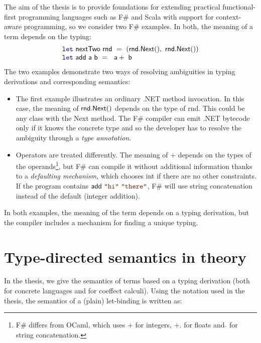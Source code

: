 \documentclass[
		twoside,openright,titlepage,numbers=noenddot,headinclude,%
                footinclude=true,cleardoublepage=empty,
                BCOR=10mm,paper=a4,fontsize=10pt, %
                ngerman,american, %
                ]{scrreprt}
\newcommand{\kvd}[1]{\textnormal{\textcolor{kvdclr}{\ttfamily #1}}}
\newcommand{\str}[1]{\textnormal{\textcolor{strclr}{\ttfamily "#1"}}}
\newcommand{\ident}[1]{\textnormal{\sffamily #1}}
\begin{document}
The aim of the thesis is to provide foundations for extending practical functional-first
programming languages such as F\# \cite{app-fsharp-spec} and Scala \cite{app-scala-spec} with
support for context-aware programming, so we consider two F\# examples. In both, the meaning of
a term depends on the typing:
%
\begin{equation*}
\begin{array}{l}
  \kvd{let}~\ident{nextTwo}~\ident{rnd}~=~(\ident{rnd.Next}(), \ident{rnd.Next}()) \\
  \kvd{let}~\ident{add}~\ident{a}~\ident{b}~=~\ident{a}+\ident{b}
\end{array}
\end{equation*}
%
The two examples demonstrate two ways of resolving ambiguities in typing derivations and
corresponding semantics:

\begin{itemize}
\item The first example illustrates an ordinary .NET method invocation. In this case,
  the meaning of $\ident{rnd.Next}()$ depends on the type of \ident{rnd}. This could be any
  class with the \ident{Next} method. The F\# compiler can emit .NET bytecode only if it knows the
  concrete type and so the developer has to resolve the ambiguity through a \emph{type annotation}.

\item Operators are treated differently. The meaning of $+$ depends on the types of the
  operands\footnote{F\# differs from OCaml, which uses $+$ for integers, $+.$ for floats and
  $\hat{}$ for string concatenation.}, but F\# can compile it without additional information thanks
  to a \emph{defaulting mechanism}, which chooses \ident{int} if there are no other constraints.
  If the program contains $\ident{add}~\str{hi}~\str{there}$, F\# will use string concatenation
  instead of the default (integer addition).
\end{itemize}

\noindent
In both examples, the meaning of the term depends on a typing derivation, but the compiler includes
a mechanism for finding a unique typing.

\section{Type-directed semantics in theory}
\label{sec:background-theory}

In the thesis, we give the semantics of terms based on a typing derivation (both for concrete
languages and for coeffect calculi). Using the notation used in the thesis, the semantics of
a (plain) let-binding is written as:
\end{document}
